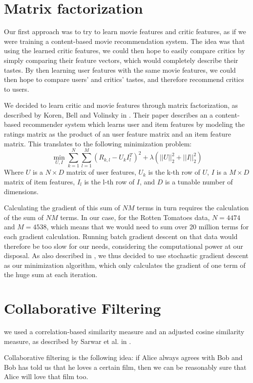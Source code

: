 \documentclass[12pt]{article}
\begin{document}
\section{Matrix factorization}

	Our first approach was to try to learn movie features and critic features, as if we were training a content-based movie recommendation system. The idea was that using the learned critic features, we could then hope to easily compare critics by simply comparing their feature vectors, which would completely describe their tastes. By then learning user features with the same movie features, we could then hope to compare users' and critics' tastes, and therefore recommend critics to users. 

	We decided to learn critic and movie features through matrix factorization, as described by Koren, Bell and Volinsky in \cite{Koren09}. Their paper describes an a content-based recommender system which learns user and item features by modeling the ratings matrix as the product of an user feature matrix and an item feature matrix. This translates to the following minimization problem:
	$$ \min_{U,I} \sum_{k = 1}^{N} \sum_{l = 1}^{M} (R_{k,l} - U_k I_l^T)^2 + \lambda (||U||_2^2 + ||I||_2^2) $$
	Where $U$ is a $N \times D$ matrix of user features, $U_k$ is the k-th row of $U$, $I$ is a $M \times D$ matrix of item features, $I_l$ is the l-th row of $I$, and $D$ is a tunable number of dimensions.

	Calculating the gradient of this sum of $NM$ terms in turn requires the calculation of the sum of $NM$ terms. In our case, for the Rotten Tomatoes data, $N = 4474$ and $M = 4538$, which means that we would need to sum over 20 million terms for each gradient calculation. Running batch gradient descent on that data would therefore be too slow for our needs, considering the computational power at our disposal. As also described in \cite{Koren09}, we thus decided to use stochastic gradient descent as our minimization algorithm, which only calculates the gradient of one term of the huge sum at each iteration.


\section{Collaborative Filtering}


we used a correlation-based similarity measure and an adjusted cosine similarity measure, as described by Sarwar et al. in \cite{Sarwar01}.

Collaborative filtering is the following idea: if Alice always agrees with Bob and Bob has told us that he loves a certain film, then we can be reasonably sure that Alice will love that film too.
\end{document}
